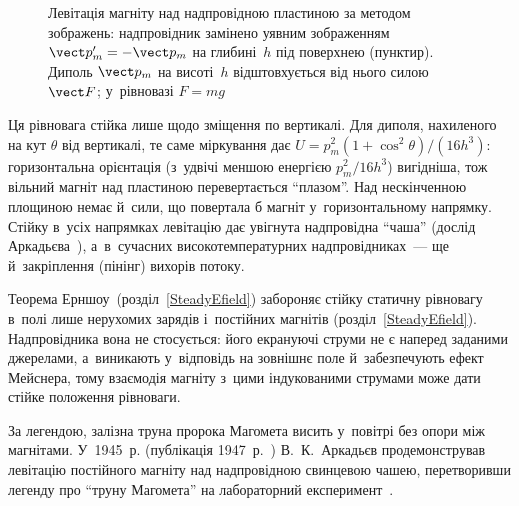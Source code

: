 \begin{figure}\centering
	\caption{Левітація магніту над надпровідною пластиною за методом зображень: надпровідник замінено уявним зображенням $\vect p_m'=-\vect p_m$ на глибині~$h$ під поверхнею (пунктир).
		Диполь $\vect p_m$ на висоті~$h$ відштовхується від нього силою $\vect F$; у~рівновазі $F=mg$\label{pic:Levitation}}
\end{figure}

Ця рівновага стійка лише щодо зміщення по вертикалі. Для диполя, нахиленого на
кут $\theta$ від вертикалі, те саме міркування дає $U=p_m^2(1+\cos^2\theta)/(16h^3)$:
горизонтальна орієнтація (з~удвічі меншою енергією $p_m^2/16h^3$) вигідніша, тож вільний
магніт над пластиною перевертається \enquote{плазом}. Над нескінченною площиною немає
й~сили, що повертала б магніт у~горизонтальному напрямку. Стійку в~усіх напрямках
левітацію дає увігнута надпровідна \enquote{чаша} (дослід Аркадьєва~\cite{Arkadiev1947}), а~в~сучасних
високотемпературних надпровідниках~--- ще й~закріплення (пінінг) вихорів потоку.

Теорема Ерншоу~(розділ~\ref{SteadyEfield}) забороняє стійку статичну рівновагу в~полі лише нерухомих зарядів і~постійних магнітів (розділ~\ref{SteadyEfield}). Надпровідника вона не стосується: його екрануючі струми не є наперед заданими джерелами, а~виникають у~відповідь на зовнішнє поле й~забезпечують ефект Мейснера, тому взаємодія магніту з~цими індукованими струмами може дати стійке положення рівноваги.


\begin{Historical}[unbreakable]
	За легендою, залізна труна пророка Магомета висить у~повітрі без опори між магнітами. У~1945~р. (публікація 1947~р.~\cite{Arkadiev1947}) В.~К.~Аркадьєв продемонстрував левітацію постійного
	магніту над надпровідною свинцевою чашею, перетворивши легенду про \enquote{труну
		Магомета} на лабораторний експеримент~\cite{Arkadiev1947}.
\end{Historical}

